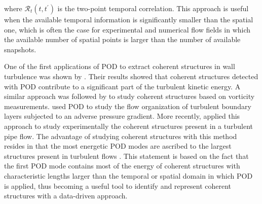 \noindent where $\mathcal{R}_t(t,t^{\prime})$ is the two-point temporal correlation.
This approach is useful when the available temporal information is significantly smaller than the spatial one, which is often the case for experimental and numerical flow fields in which the available number of spatial points is larger than the number of available snapshots.

One of the first applications of POD to extract coherent structures in wall turbulence was shown by \citet{moin1989characteristic}.
Their results showed that coherent structures detected with POD contribute to a significant part of the turbulent kinetic energy.
A similar approach was followed by \citet{gurka2006pod} to study coherent structures based on vorticity measurements.
\citet{sanmiguel2017adverse} used POD to study the flow organization of turbulent boundary layers subjected to an adverse pressure gradient.
More recently, \citet{discetti2019characterization} applied this approach to study experimentally the coherent structures present in a turbulent pipe flow.
The advantage of studying coherent structures with this method resides in that the most energetic POD modes are ascribed to the largest structures present in turbulent flows \citep{wu2014study}.
This statement is based on the fact that the first POD mode contains most of the energy of coherent structures with characteristic lengths larger than the temporal or spatial domain in which POD is applied, thus becoming a useful tool to identify and represent coherent structures with a data-driven approach.

